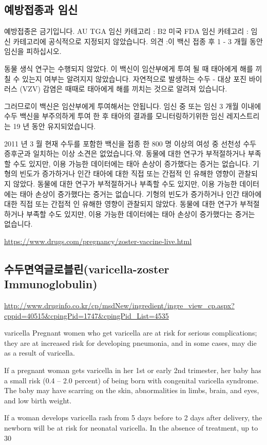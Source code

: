\subsection{예방접종과 임신}
예방접종은 금기입니다. AU TGA 임신 카테고리 : B2 미국 FDA 임신 카테고리 : 임신 카테고리에 공식적으로 지정되지 않았습니다. 의견 :이 백신 접종 후 1 - 3 개월 동안 임신을 피하십시오.

동물 생식 연구는 수행되지 않았다. 이 백신이 임산부에게 투여 될 때 태아에게 해를 끼칠 수 있는지 여부는 알려지지 않았습니다. 자연적으로 발생하는 수두 - 대상 포진 바이러스 (VZV) 감염은 때때로 태아에게 해를 끼치는 것으로 알려져 있습니다.\par
그러므로이 백신은 임산부에게 투여해서는 안됩니다. 임신 중 또는 임신 3 개월 이내에 수두 백신을 부주의하게 투여 한 후 태아의 결과를 모니터링하기위한 임신 레지스트리는 19 년 동안 유지되었습니다. \par
2011 년 3 월 현재 수두를 포함한 백신을 접종 한 800 명 이상의 여성 중 선천성 수두 증후군과 일치하는 이상 소견은 없었습니다.약. 동물에 대한 연구가 부적절하거나 부족할 수도 있지만, 이용 가능한 데이터에는 태아 손상이 증가했다는 증거는 없습니다. 
기형의 빈도가 증가하거나 인간 태아에 대한 직접 또는 간접적 인 유해한 영향이 관찰되지 않았다. 동물에 대한 연구가 부적절하거나 부족할 수도 있지만, 이용 가능한 데이터에는 태아 손상이 증가했다는 증거는 없습니다. 기형의 빈도가 증가하거나 인간 태아에 대한 직접 또는 간접적 인 유해한 영향이 관찰되지 않았다. 동물에 대한 연구가 부적절하거나 부족할 수도 있지만, 이용 가능한 데이터에는 태아 손상이 증가했다는 증거는 없습니다.\par
\url{https://www.drugs.com/pregnancy/zoster-vaccine-live.html}

\subsection{수두면역글로블린(varicella-zoster Immunoglobulin)}
\url{http://www.druginfo.co.kr/cp/msdNew/ingredient/ingre_view_cp.aspx?cppid=40515&cpingPid=1747&cpingPid_List=4535}

\begin{commentbox}{varicella}
Pregnant women who get varicella are at risk for serious complications; they are at increased risk for developing pneumonia, and in some cases, may die as a result of varicella.\par
If a pregnant woman gets varicella in her 1st or early 2nd trimester, her baby has a small risk (0.4 – 2.0 percent) of being born with congenital varicella syndrome. The baby may have scarring on the skin, abnormalities in limbs, brain, and eyes, and low birth weight.\par
If a woman develops varicella rash from 5 days before to 2 days after delivery, the newborn will be at risk for neonatal varicella. In the absence of treatment, up to 30%
\end{commentbox}


